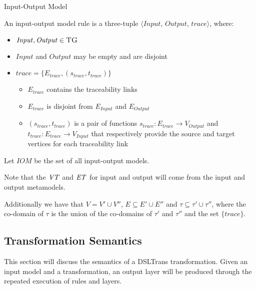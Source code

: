 \begin{definition}{Input-Output Model\\}
\label{def:input_output_model}

An input-output model rule is a three-tuple $\big\langle \mathit{Input}$, $\mathit{Output}$, $\mathit{trace}\big\rangle$, where:

\begin{itemize}
\item $\mathit{Input}, \mathit{Output} \in \textsc{TG}$
\item $\mathit{Input}$ and $\mathit{Output} $ may be empty and are disjoint
\item $\mathit{trace} = \{E_{trace}, (s_{trace}, t_{trace})\}$
\begin{itemize}
\item $E_{trace}$ contains the traceability links
\item $E_{trace} $ is disjoint from $E_{Input}$ and $E_{Output}$
\item $(s_{trace}, t_{trace})$ is a pair of functions $s_{trace}: E_{trace}\rightarrow V_{\textit{Output}}$ and $t_{trace}: E_{trace}\rightarrow V_{\textit{Input}}$ that respectively provide the source and target vertices for each traceability link
\end{itemize}

\end{itemize}  

Let $\mathit{IOM}$ be the set of all input-output models.

Note that the $\mathit{VT}$ and $\mathit{ET}$ for input and output will come from the input and output metamodels.  

Additionally we have that $V=V'\cup V''$, $E\subseteq E'\cup E''$ and $\tau\subseteq \tau'\cup \tau''$, where the co-domain of $\tau$ is the union of the co-domains of $\tau'$ and $\tau''$ and the set $\{trace\}$.

\end{definition}


\subsection{Transformation Semantics}
\label{sec:DSLTrans_semantics}

This section will discuss the semantics of a DSLTrans transformation. Given an input model and a transformation, an output layer will be produced through the repeated execution of rules and layers.


